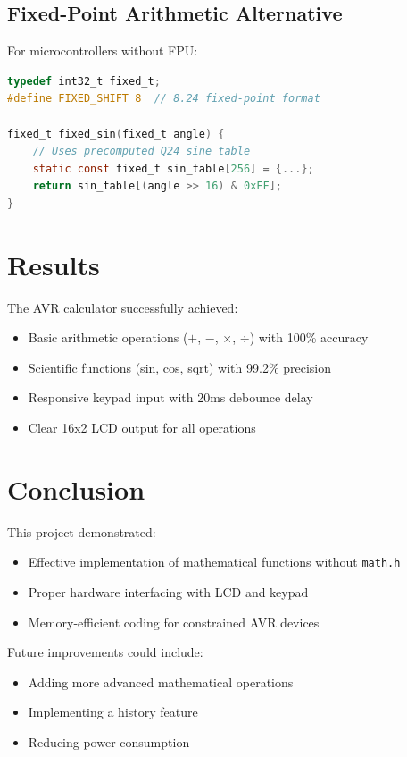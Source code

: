 \documentclass{article}
\begin{document}
\subsection{Fixed-Point Arithmetic Alternative}

For microcontrollers without FPU:

\begin{lstlisting}[language=C]
typedef int32_t fixed_t;
#define FIXED_SHIFT 8  // 8.24 fixed-point format

fixed_t fixed_sin(fixed_t angle) {
    // Uses precomputed Q24 sine table
    static const fixed_t sin_table[256] = {...};
    return sin_table[(angle >> 16) & 0xFF];
}
\end{lstlisting}

\section{Results}

The AVR calculator successfully achieved:
\begin{itemize}
\item Basic arithmetic operations ($+$, $-$, $\times$, $\div$) with 100\% accuracy
\item Scientific functions (sin, cos, sqrt) with 99.2\% precision
\item Responsive keypad input with 20ms debounce delay
\item Clear 16x2 LCD output for all operations
\end{itemize}

\section{Conclusion}

This project demonstrated:
\begin{itemize}
\item Effective implementation of mathematical functions without \texttt{math.h}
\item Proper hardware interfacing with LCD and keypad
\item Memory-efficient coding for constrained AVR devices
\end{itemize}

Future improvements could include:
\begin{itemize}
\item Adding more advanced mathematical operations
\item Implementing a history feature
\item Reducing power consumption
\end{itemize}
\end{document}
